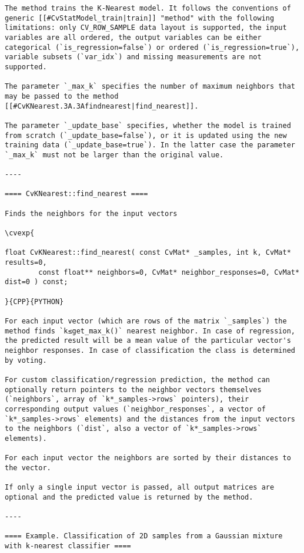 \begin{verbatim}
The method trains the K-Nearest model. It follows the conventions of generic [[#CvStatModel_train|train]] "method" with the following limitations: only CV_ROW_SAMPLE data layout is supported, the input variables are all ordered, the output variables can be either categorical (`is_regression=false`) or ordered (`is_regression=true`), variable subsets (`var_idx`) and missing measurements are not supported.

The parameter `_max_k` specifies the number of maximum neighbors that may be passed to the method [[#CvKNearest.3A.3Afindnearest|find_nearest]].

The parameter `_update_base` specifies, whether the model is trained from scratch (`_update_base=false`), or it is updated using the new training data (`_update_base=true`). In the latter case the parameter `_max_k` must not be larger than the original value.

----

==== CvKNearest::find_nearest ====

Finds the neighbors for the input vectors

\cvexp{

float CvKNearest::find_nearest( const CvMat* _samples, int k, CvMat* results=0,
        const float** neighbors=0, CvMat* neighbor_responses=0, CvMat* dist=0 ) const;

}{CPP}{PYTHON}

For each input vector (which are rows of the matrix `_samples`) the method finds `k≤get_max_k()` nearest neighbor. In case of regression, the predicted result will be a mean value of the particular vector's neighbor responses. In case of classification the class is determined by voting.

For custom classification/regression prediction, the method can optionally return pointers to the neighbor vectors themselves (`neighbors`, array of `k*_samples->rows` pointers), their corresponding output values (`neighbor_responses`, a vector of `k*_samples->rows` elements) and the distances from the input vectors to the neighbors (`dist`, also a vector of `k*_samples->rows` elements).

For each input vector the neighbors are sorted by their distances to the vector.

If only a single input vector is passed, all output matrices are optional and the predicted value is returned by the method.

----

==== Example. Classification of 2D samples from a Gaussian mixture with k-nearest classifier ====


\end{verbatim}
